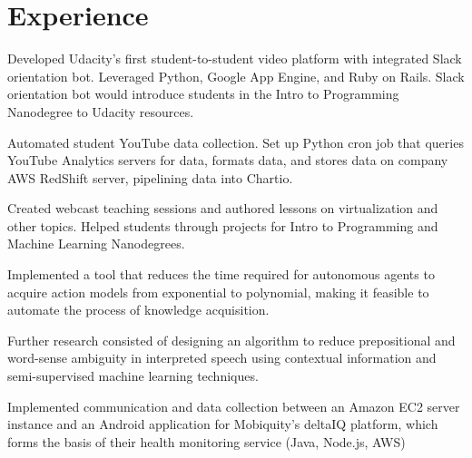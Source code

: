 \documentclass[]{deedy-resume-openfont}
\begin{document}
\hfill
\begin{minipage}[t]{0.66\textwidth} 


\section{Experience}

\vspace{\topsep} %
\begin{tightemize}
\item Developed Udacity's first student-to-student video platform with integrated Slack orientation bot. Leveraged Python, Google App Engine, and Ruby on Rails. Slack orientation bot would introduce students in the Intro to Programming Nanodegree to Udacity resources.

\item Automated student YouTube data collection. Set up Python cron job that queries YouTube Analytics servers for data, formats data, and stores data on company AWS RedShift server, pipelining data into Chartio. 

\item Created webcast teaching sessions and authored lessons on virtualization and other topics. Helped students through projects for Intro to Programming and Machine Learning Nanodegrees.
\end{tightemize}
\sectionsep

\begin{tightemize}
\item Implemented a tool that reduces the time required for autonomous agents to acquire action models from exponential to polynomial, making it feasible to automate the process of knowledge acquisition.

\item Further research consisted of designing an algorithm to reduce prepositional and word-sense ambiguity in interpreted speech using contextual information and semi-supervised machine learning techniques.
\end{tightemize}
\sectionsep

\begin{tightemize}
\item Implemented communication and data collection between an Amazon EC2 server instance and an Android application for Mobiquity’s deltaIQ platform, which forms the basis of their health monitoring service (Java, Node.js, AWS)


\end{tightemize}
\end{minipage}
\end{document}
